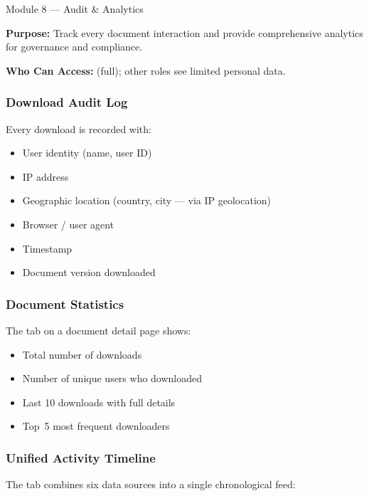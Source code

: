 \begin{ugModule}{Module 8 --- Audit \& Analytics}

  \textbf{Purpose:}
  Track every document interaction and provide comprehensive
  analytics for governance and compliance.

  \textbf{Who Can Access:}
    (full); other roles see
  limited personal data.

  \subsubsection*{Download Audit Log}
  Every download is recorded with:
  \begin{itemize}[leftmargin=18pt]
    \item User identity (name, user ID)
    \item IP address
    \item Geographic location (country, city --- via IP
          geolocation)
    \item Browser / user agent
    \item Timestamp
    \item Document version downloaded
  \end{itemize}

  \subsubsection*{Document Statistics}
  The  tab on a document detail page shows:
  \begin{itemize}[leftmargin=18pt]
    \item Total number of downloads
    \item Number of unique users who downloaded
    \item Last 10 downloads with full details
    \item Top~5 most frequent downloaders
  \end{itemize}

  \subsubsection*{Unified Activity Timeline}
  The  tab combines six data sources into
  a single chronological feed:


\end{ugModule}
